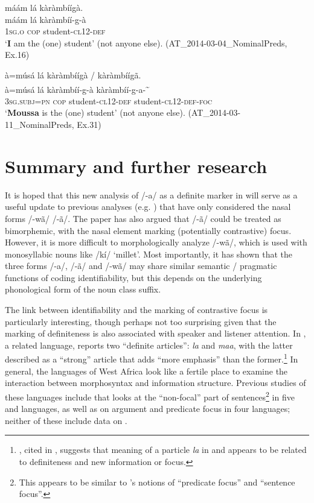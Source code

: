 \documentclass[output=paper]{langsci/langscibook}
\begin{document}
\ea\label{ex:teo:63}
\glll máám lá kàràmbíígà.\\
máám lá kàràmbíí-g-à\\
\textsc{1sg.o} \textsc{cop} student-\textsc{cl12-def}\\
\glt ‘\textbf{I} am the (one) student’ (not anyone else). (AT\_2014-03-04\_NominalPreds, Ex.16)
\z

\ea\label{ex:teo:64}
\glll à=músá lá {kàràmbíígà /} kàràmbíígã. \\
à=músá lá kàràmbíí-g-à kàràmbíí-g-a-\textsuperscript{\~{}} \\
\textsc{3sg.subj=pn} \textsc{cop} student-\textsc{cl12-def} student-\textsc{cl12-def-foc}\\
\glt ‘\textbf{Mo}\textbf{ussa} is the (one) student’ (not anyone else). (AT\_2014-03-11\_NominalPreds, Ex.31)
\z

\section{Summary and further research}\label{sec:teo:8}

It is hoped that this new analysis of /-a/ as a definite marker in  will serve as a useful update to previous analyses (e.g. \citealt{Peterson1971,canu1974}) that have only considered the nasal forms /-wã/ {\Tilde} /-ã/. The paper has also argued that /-ã/ could be treated as bimorphemic, with the nasal element marking (potentially contrastive) focus. However, it is more difficult to morphologically analyze \mbox{/-wã/}, which is used with monosyllabic nouns like /kí/ ‘millet’. Most importantly, it has shown that the three forms /-a/, /-ã/ and /-wã/ may share similar semantic / pragmatic functions of coding identifiability, but this depends on the underlying phonological form of the noun class suffix.

The link between identifiability and the marking of contrastive focus is particularly interesting, though perhaps not too surprising given that the marking of definiteness is also associated with speaker and listener attention. In , a related  language, \citet[40]{Olawsky1999} reports two “definite articles”: \textit{la} and \textit{maa}, with the latter described as a “strong” article that adds “more emphasis” than the former.\footnote{\cite{KroppDakubu1991}, cited in \citet[30]{Olawsky1999}, suggests that meaning of a particle \textit{la} in  and  appears to be related to definiteness and new information or focus.} In general, the languages of West Africa look like a fertile place to examine the interaction between morphosyntax and information structure. Previous studies of these languages include \cite{FiedlerSchwarz2005} that looks at the “non-focal” part of sentences\footnote{This appears to be similar to \cite{Lambrecht1994}'s notions of “predicate focus” and “sentence focus”.} in five  and  languages, as well as \cite{Schwarz2010gur} on argument and predicate focus in four  languages; neither of these include data on .
\end{document}
